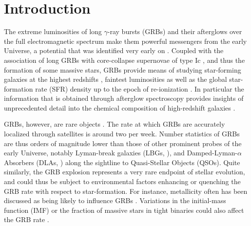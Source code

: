\documentclass[traditabstract, longauth]{aa}
\begin{document}
\maketitle

\section{Introduction}

The extreme luminosities of long $\gamma$-ray bursts (GRBs) and their afterglows \citep[e.g.,][for recent reviews]{2009ARA&A..47..567G, 2014arXiv1410.0679K} over the full electromagnetic spectrum make them powerful messengers from the early Universe, a potential that was identified very early on \citep[e.g.,][]{1998MNRAS.294L..13W, 2000ApJ...536....1L}. Coupled with the association of long GRBs with core-collapse supernovae of type Ic \citep[e.g.,][]{1998Natur.395..670G, 2003Natur.423..847H, 2006Natur.442.1011P}, and thus the formation of some massive stars, GRBs provide means of studying star-forming galaxies at the highest redshifts \citep[e.g.,][]{2007ApJ...671..272C, 2009ApJ...691..152C, 2012ApJ...754...46T}, faintest luminosities \citep[e.g.,][]{2001ApJ...546..672V, 2012ApJ...749L..38T} as well as the global star-formation rate (SFR) density up to the epoch of re-ionization \citep[e.g.,][]{2009ApJ...705L.104K, 2012ApJ...744...95R, 2012A&A...539A.113E}. In particular the information that is obtained through afterglow spectroscopy provides insights of unprecedented detail into the chemical composition of high-redshift galaxies \citep[e.g.,][]{2006A&A...451L..47F, 2009ApJ...691L..27P, 2013MNRAS.428.3590T}.

GRBs, however, are rare objects \citep[e.g.,][]{2004ApJ...607L..17P, 2007ApJ...657L..73G}. The rate at which GRBs are accurately localized through satellites is around two per week. Number statistics of GRBs are thus orders of magnitude lower than those of other prominent probes of the early Universe, notably Lyman-break galaxies (LBGs, \citealp[e.g.,][]{1996ApJ...462L..17S}), and Damped-Lyman-$\alpha$ Absorbers (DLAs, \citealp[e.g.,][]{2005ARA&A..43..861W}) along the sightline to Quasi-Stellar Objects (QSOs). Quite similarly, the GRB explosion represents a very rare endpoint of stellar evolution, and could thus be subject to environmental factors enhancing or quenching the GRB rate with respect to star-formation. For instance, metallicity often has been discussed as being likely to influence GRBs \citep[e.g.,][]{2006AcA....56..333S, 2008AJ....135.1136M}. Variations in the initial-mass function (IMF) or the fraction of massive stars in tight binaries could also affect the GRB rate \citep[][]{2014ApJ...789...23K}.
\end{document}
